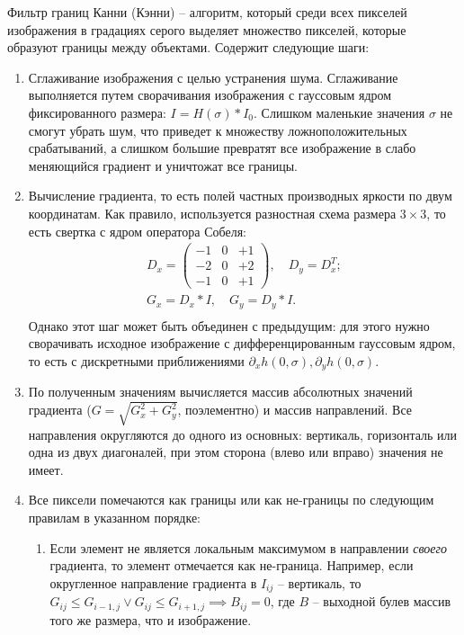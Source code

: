 
Фильтр границ Канни (Кэнни) -- алгоритм, который среди всех пикселей изображения в градациях серого выделяет множество пикселей, которые образуют границы между объектами. Содержит следующие шаги:
\begin{enumerate}
\item
    Сглаживание изображения с целью устранения шума. Сглаживание выполняется путем сворачивания изображения с гауссовым ядром фиксированного размера: $I = H(\sigma) * I_0$. Слишком маленькие значения $\sigma$ не смогут убрать шум, что приведет к множеству ложноположительных срабатываний, а слишком большие превратят все изображение в слабо меняющийся градиент и уничтожат все границы.
\item
    Вычисление градиента, то есть полей частных производных яркости по двум координатам. Как правило, используется разностная схема размера $3 \times 3$, то есть свертка с ядром оператора Собеля:
    \begin{gather*}
        D_x = \begin{pmatrix}
            -1 & 0 & +1\\
            -2 & 0 & +2\\
            -1 & 0 & +1
        \end{pmatrix},
        \quad
        D_y = D_x^T;\\
        G_x = D_x * I, \quad G_y = D_y * I. \\
    \end{gather*}
    Однако этот шаг может быть объединен с предыдущим: для этого нужно сворачивать исходное изображение с дифференцированным гауссовым ядром, то есть с дискретными приближениями $\partial_x h(0, \sigma), \partial_y h(0, \sigma)$.
\item
    По полученным значениям вычисляется массив абсолютных значений градиента ($G = \sqrt{G_x^2 + G_y^2}$, поэлементно) и массив направлений. Все направления округляются до одного из основных: вертикаль, горизонталь или одна из двух диагоналей, при этом сторона (влево или вправо) значения не имеет.
\item
    Все пиксели помечаются как границы или как не-границы по следующим правилам в указанном порядке:
    \begin{enumerate}
    \item
        Если элемент не является локальным максимумом в направлении \textit{своего} градиента, то элемент отмечается как не-граница. Например, если округленное направление градиента в $I_{ij}$ -- вертикаль, то $G_{ij} \le G_{i-1,j} \vee G_{ij} \le G_{i+1,j} \implies B_{ij} = 0$, где $B$ -- выходной булев массив того же размера, что и изображение.

\end{enumerate}
\end{enumerate}
